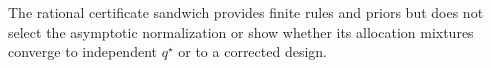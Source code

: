 The rational certificate sandwich provides finite rules and priors but does not select the asymptotic normalization or show whether its allocation mixtures converge to independent \(q^\star\) or to a corrected design.